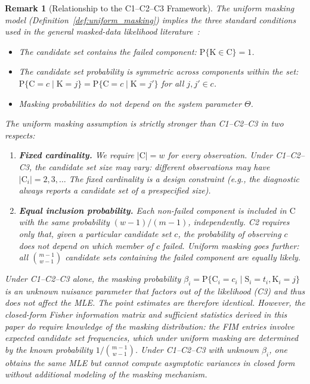 \documentclass[pdflatex,sn-mathphys-num,Numbered]{sn-jnl}
\newcommand{\RV}[1]{\mathrm{#1}}
\newcommand{\Prob}[1]{\mathrm{P}\{#1\}}
\newcommand{\sv}{\RV{S}}           %
\newcommand{\cand}{\RV{C}}         %
\newcommand{\sysparam}{\Theta}
\theoremstyle{thmstyleone}
\theoremstyle{thmstylethree}
\theoremstyle{thmstyletwo}
\newtheorem{remark}[theorem]{Remark}
\begin{document}
\begin{remark}[Relationship to the C1--C2--C3 Framework]
\label{rem:c1c2c3_comparison}
The uniform masking model (Definition~\ref{def:uniform_masking}) implies the three standard conditions used in the general masked-data likelihood literature~\cite{towell2025masked}:
\begin{itemize}
\item[\textbf{C1.}] The candidate set contains the failed component: $\Prob{\RV{K} \in \cand} = 1$.
\item[\textbf{C2.}] The candidate set probability is symmetric across components within the set: $\Prob{\cand = c \mid \RV{K} = j} = \Prob{\cand = c \mid \RV{K} = j'}$ for all $j, j' \in c$.
\item[\textbf{C3.}] Masking probabilities do not depend on the system parameter $\sysparam$.
\end{itemize}

\noindent The uniform masking assumption is \emph{strictly stronger} than C1--C2--C3 in two respects:
\begin{enumerate}
\item \textbf{Fixed cardinality.} We require $|\cand| = w$ for every observation.  Under C1--C2--C3, the candidate set size may vary: different observations may have $|\cand_i| = 2, 3, \ldots$ The fixed cardinality is a design constraint (e.g., the diagnostic always reports a candidate set of a prespecified size).

\item \textbf{Equal inclusion probability.} Each non-failed component is included in $\cand$ with the same probability $(w-1)/(m-1)$, independently.  C2 requires only that, \emph{given a particular candidate set $c$}, the probability of observing $c$ does not depend on which member of $c$ failed.  Uniform masking goes further: all $\binom{m-1}{w-1}$ candidate sets containing the failed component are equally likely.
\end{enumerate}

\noindent Under C1--C2--C3 alone, the masking probability $\beta_i = \Prob{\cand_i = c_i \mid \sv_i = t_i, \RV{K}_i = j}$ is an unknown nuisance parameter that factors out of the likelihood (C3) and thus does not affect the MLE.  The point estimates are therefore identical.  However, the closed-form Fisher information matrix and sufficient statistics derived in this paper \emph{do} require knowledge of the masking distribution: the FIM entries involve expected candidate set frequencies, which under uniform masking are determined by the known probability $1/\binom{m-1}{w-1}$.  Under C1--C2--C3 with unknown $\beta_i$, one obtains the same MLE but cannot compute asymptotic variances in closed form without additional modeling of the masking mechanism.


\end{remark}
\end{document}
